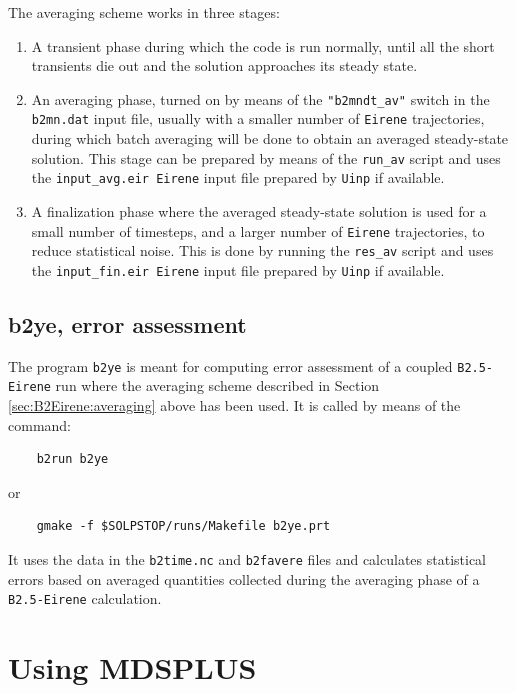 \documentclass[a4paper,10pt]{report}
\begin{document}
The averaging scheme works in three stages:
\begin{enumerate}
  \item{A transient phase} during which the code is run normally, until all the short transients die out and the solution approaches its steady state.
  \item{An averaging phase}, turned on by means of the {\tt "b2mndt\_av"} switch in the {\tt b2mn.dat} input file, usually with a smaller number of {\tt Eirene} trajectories, during which batch averaging will be done to obtain an averaged steady-state solution. This stage can be prepared by means of the {\tt run\_av} script and uses the {\tt input\_avg.eir Eirene} input file prepared by {\tt Uinp} if available.
  \item{A finalization phase} where the averaged steady-state solution is used for a small number of timesteps, and a larger number of {\tt Eirene} trajectories, to reduce statistical noise. This is done by running the {\tt res\_av} script and uses the {\tt input\_fin.eir Eirene} input file prepared by {\tt Uinp} if available.
\end{enumerate}

\section{b2ye, error assessment}
\label{sec:b2ye}

The program {\tt b2ye} is meant for computing error assessment of a coupled {\tt B2.5-Eirene} run where the averaging scheme described in Section \ref{sec:B2Eirene:averaging} above has been used. It is called by means of the command:
\begin{verbatim}
    b2run b2ye
\end{verbatim}
or
\begin{verbatim}
    gmake -f $SOLPSTOP/runs/Makefile b2ye.prt
\end{verbatim}

It uses the data in the {\tt b2time.nc} and {\tt b2favere} files and calculates statistical errors based on averaged quantities collected during the averaging phase of a {\tt B2.5-Eirene} calculation.

\chapter{Using MDSPLUS}
\label{cha:MDSplus}
\end{document}
